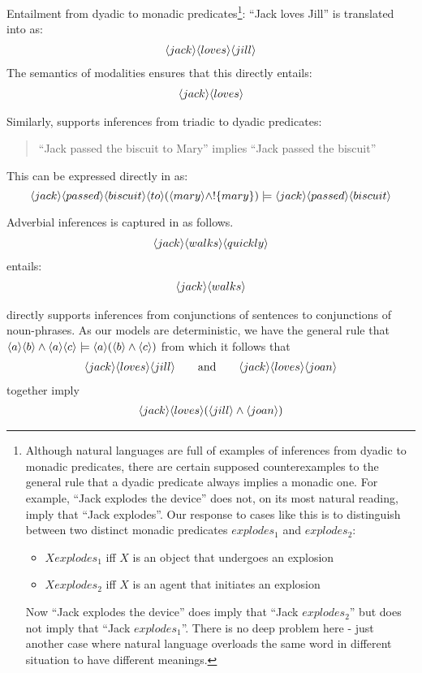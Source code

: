 \NI Entailment from dyadic to monadic predicates\footnote{Although natural languages are full of examples of inferences from dyadic to monadic predicates, there are certain supposed counterexamples to the general rule that a dyadic predicate always implies a monadic one. For example, ``Jack explodes the device'' does not, on its most natural reading, imply that ``Jack explodes''. Our response to cases like this is to distinguish between two distinct monadic predicates $explodes_1$ and $explodes_2$:
 \begin{itemize}
 \item
 $X explodes_1$ iff $X$ is an object that undergoes an explosion
 \item
 $X explodes_2$ iff $X$ is an agent that initiates an explosion
 \end{itemize}
 Now ``Jack explodes the device'' does imply that ``Jack $explodes_2$'' but does not imply that ``Jack $explodes_1$''. 
There is no deep problem here - just another case where natural language overloads the same word in different situation to have different meanings.}:
``Jack loves Jill'' is translated into \cathoristic{} as:
\begin{eqnarray*}
   \langle jack \rangle \langle loves \rangle \langle jill \rangle \end{eqnarray*}
The semantics of modalities ensures that this directly entails:
\begin{eqnarray*}
   \langle jack \rangle \langle loves \rangle \end{eqnarray*}

\NI Similarly, \cathoristic{} supports inferences from triadic to dyadic
predicates:
\begin{quote}
  ``Jack passed the biscuit to Mary'' implies ``Jack passed the biscuit''
\end{quote}

\NI This can be expressed directly in \cathoristic{} as:
\[
   \langle jack \rangle \langle passed \rangle \langle biscuit \rangle \langle to \rangle (\langle mary \rangle \land !\{mary\}) \models \langle jack \rangle \langle passed \rangle \langle biscuit \rangle \]

\NI Adverbial inferences is captured in \cathoristic{} as follows.
\begin{eqnarray*}
\langle jack \rangle \langle walks \rangle \langle quickly \rangle \end{eqnarray*}
entails:
\begin{eqnarray*}
\langle jack \rangle \langle walks \rangle \end{eqnarray*}

\NI \Cathoristic{} directly supports inferences from conjunctions of
sentences to conjunctions of noun-phrases.  As our models are
deterministic, we have the general rule that $ \langle a \rangle \langle b \rangle \land
\langle a \rangle \langle c \rangle \models \langle a \rangle (\langle b \rangle \land \langle c \rangle )$ from which
it follows that
\begin{eqnarray*}
   \langle jack \rangle \langle loves \rangle \langle jill \rangle \qquad\text{and}\qquad
   \langle jack \rangle \langle loves \rangle \langle joan \rangle \end{eqnarray*}
together imply
\begin{eqnarray*}
\langle jack \rangle \langle loves \rangle (\langle jill \rangle \land \langle joan \rangle )
\end{eqnarray*}

